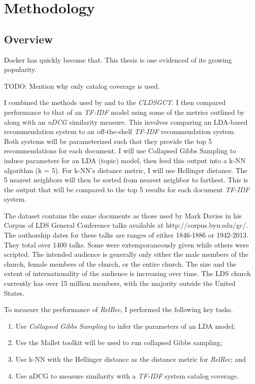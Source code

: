 \chapter{Methodology} \label{chp:chapter2}

\section{Overview}
Docker has quickly become that. This thesis is one evidenced of its growing popularity. %

TODO: Mention why only catalog coverage is used.

I combined the methods used by \citeyearpar{hall-jurafsky-manning:2008:EMNLP} %
and \citeyearpar{Krstovski2013efficient} %
to the \emph{CLDSGCT}. I then compared performance to that of an \emph{TF-IDF} model using some of the metrics outlined by \citeyearpar{Ge:2010:BAE:1864708.1864761} %
along with an \emph{nDCG} similarity measure. This involves comparing an LDA-based recommendation system to an off-the-shelf \emph{TF-IDF} recommendation system. Both systems will be parameterized such that they provide the top 5 recommendations for each document. I will use Collapsed Gibbs Sampling to induce parameters for an LDA (topic) model, then feed this output into a k-NN algorithm (k = 5). For k-NN’s distance metric, I will use Hellinger distance. The 5 nearest neighbors will then be sorted from nearest neighbor to farthest. This is the output that will be compared to the top 5 results for each document \emph{TF-IDF} system.

The dataset contains the same documents as those used by Mark Davies in his Corpus of LDS General Conference talks available at http://corpus.byu.edu/gc/. The authorship dates for these talks are ranges of either 1846-1886 or 1942-2013. They total over 1400 talks. Some were extemporaneously given while others were scripted. The intended audience is generally only either the male members of the church, female members of the church, or the entire church. The size and the extent of internationality of the audience is increasing over time. The LDS church currently has over 15 million members, with the majority outside the United States.

To measure the performance of \emph{RelRec}, I performed the following key tasks.

\begin{enumerate}
	\item Use \textit{Collapsed Gibbs Sampling} to infer the parameters of an LDA model;
	\item Use the Mallet toolkit will be used to run collapsed Gibbs sampling;
	\item Use k-NN with the Hellinger distance as the distance metric for \emph{RelRec}; and
	\item Use nDCG to measure similarity with a \emph{TF-IDF} system catalog coverage.
\end{enumerate}

